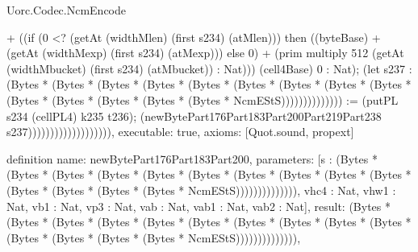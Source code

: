 \begin{lexlean}{Uorc.Codec.NcmEncode}
\begin{semanticmodule}
{+ ((if (0 <? (getAt (widthMlen) (first s234) (atMlen))) then ((byteBase) + (getAt (widthMexp) (first s234) (atMexp))) else 0) + (prim multiply 512 (getAt (widthMbucket) (first s234) (atMbucket)) : Nat))) (cell4Base) 0 : Nat); (let s237 : (Bytes * (Bytes * (Bytes * (Bytes * (Bytes * (Bytes * (Bytes * (Bytes * (Bytes * (Bytes * (Bytes * (Bytes * (Bytes * (Bytes * NcmEStS)))))))))))))) := (putPL s234 (cellPL4) k235 t236); (newBytePart176Part183Part200Part219Part238 s237))))))))))))))))))),
  executable: true,
  axioms: [Quot.sound, propext]
}

definition{
  name: newBytePart176Part183Part200,
  parameters: [s : (Bytes * (Bytes * (Bytes * (Bytes * (Bytes * (Bytes * (Bytes * (Bytes * (Bytes * (Bytes * (Bytes * (Bytes * (Bytes * (Bytes * NcmEStS)))))))))))))), vhc4 : Nat, vhw1 : Nat, vb1 : Nat, vp3 : Nat, vab : Nat, vab1 : Nat, vab2 : Nat],
  result: (Bytes * (Bytes * (Bytes * (Bytes * (Bytes * (Bytes * (Bytes * (Bytes * (Bytes * (Bytes * (Bytes * (Bytes * (Bytes * (Bytes * NcmEStS)))))))))))))),
}
\end{semanticmodule}
\end{lexlean}
